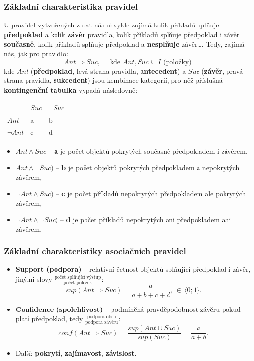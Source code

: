 \subsubsection{Základní charakteristika pravidel}
U pravidel vytvořených z dat nás obvykle zajímá kolik příkladů splňuje \textbf{předpoklad} a kolik \textbf{závěr} pravidla, kolik příkladů splňuje předpoklad i závěr \textbf{současně}, kolik příkladů splňuje předpoklad a \textbf{nesplňuje} závěr…. Tedy, zajímá nás, jak pro pravidlo:
\begin{equation}
Ant \Rightarrow Suc, \quad\textrm{ kde } Ant, Suc \subseteq I \textrm{ (položky)}
\end{equation}
kde $ Ant $ (\textbf{předpoklad}, levá strana pravidla, \textbf{antecedent}) a $ Suc $ (\textbf{závěr}, pravá strana pravidla, \textbf{sukcedent}) jsou kombinace kategorií, pro něž příslušná \textbf{kontingenční tabulka} vypadá následovně:
\begin{table}[H]
	\centering
	\begin{tabular}{l|ll}
		&  $ Suc $ & $ \neg Suc $ \\\hhline
	$ Ant $	&a  & b \\
	$ \neg Ant $	& c & d
	\end{tabular}
\end{table}
\begin{itemize}
\item $Ant \land Suc$ -- \textbf{a} je počet objektů {pokrytých současně předpokladem i závěrem},
\item $Ant \land \neg Suc)$ -- \textbf{b} je počet objektů {pokrytých předpokladem a nepokrytých závěrem},
\item $\neg Ant \land Suc)$ -- \textbf{c} je počet příkladů {nepokrytých předpokladem ale pokrytých závěrem},
\item $\neg Ant \land \neg Suc)$ -- \textbf{d} je počet příkladů {nepokrytých ani předpokladem ani závěrem}. 
\end{itemize}

\subsubsection{Základní charakteristiky asociačních pravidel}
\begin{itemize}
\item \textbf{Support (podpora)} -- relativní četnost objektů splňující předpoklad i závěr, jinými slovy {\scriptsize$\frac{\textrm{počet splňující výstup}}{\textrm{počet položek}}$}:
\begin{equation}
sup(Ant \Rightarrow Suc) = \frac{a}{a + b + c + d}, \, \in \, \langle 0; 1 \rangle.
\end{equation}
\item \textbf{Confidence (spolehlivost)} -- podmíněná pravděpodobnost závěru pokud platí předpoklad, tedy {\scriptsize$\frac{\textrm{podpora obou}}{\textrm{podpora závěru}}$}:
\begin{equation}
conf(Ant \Rightarrow Suc) = \frac{sup(Ant \cup Suc)}{sup(Suc)} = \frac{a}{a + b}.
\end{equation}
\item Další: \textbf{pokrytí}, \textbf{zajímavost}, \textbf{závislost}.
\end{itemize}

